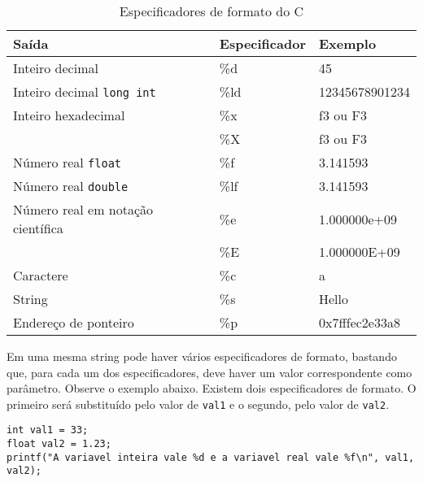 \documentclass{book}
\newcommand{\FLOAT}{{\tt float}}
\newcommand{\DOUBLE}{{\tt double}}
\newcommand{\LONGINT}{{\tt long int}}
\begin{document}
\begin{table}
\centering
  \begin{tabular}{|l|l|l|}
    \hline
        Saída                      & Especificador & Exemplo            \\
    \hline
        Inteiro decimal                      & \%d           & 45                 \\
        Inteiro decimal \LONGINT             & \%ld          & 12345678901234     \\
        Inteiro hexadecimal                  & \%x           & f3 ou F3           \\
                                             & \%X           & f3 ou F3           \\
        Número real \FLOAT                   & \%f           & 3.141593           \\
        Número real \DOUBLE                  & \%lf          & 3.141593           \\
        Número real em notação científica    & \%e           & 1.000000e+09       \\
                                             & \%E           & 1.000000E+09       \\
        Caractere                            & \%c           & a                  \\
        String                               & \%s           & Hello              \\
        Endereço de ponteiro                 & \%p           & 0x7fffec2e33a8     \\
    \hline
  \end{tabular}
  \caption{Especificadores de formato do C}
  \label{tab:format}
\end{table}

Em uma mesma string pode haver vários especificadores de formato, bastando que, para cada um dos especificadores, deve haver um valor correspondente como parâmetro. Observe o exemplo abaixo. Existem dois especificadores de formato. O primeiro será substituído pelo valor de {\tt val1} e o segundo, pelo valor de {\tt val2}.

\begin{lstlisting}
int val1 = 33;
float val2 = 1.23;
printf("A variavel inteira vale %d e a variavel real vale %f\n", val1, val2);
\end{lstlisting}





\end{document}
